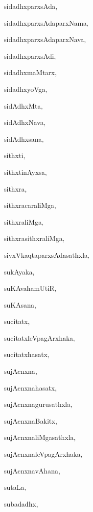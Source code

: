 \begin{multicols}{2}
{sidadhxparxsAda}, \pageref{sidadhxparxsAda}

{sidadhxparxsAdaparxNama}, \pageref{sidadhxparxsAdaparxNama}

{sidadhxparxsAdaparxNava}, \pageref{sidadhxparxsAdaparxNava}

{sidadhxparxsAdi}, \pageref{sidadhxparxsAdi}

{sidadhxmaMtarx}, \pageref{sidadhxmaMtarx}

{sidadhxyoVga}, \pageref{sidadhxyoVga}

{sidAdhxMta}, \pageref{sidAdhxMta}

{sidAdhxNava}, \pageref{sidAdhxNava}

{sidAdhxsana}, \pageref{sidAdhxsana}

{sithxti}, \pageref{sithxti}

{sithxtinAyxsa}, \pageref{sithxtinAyxsa}

{sithxra}, \pageref{sithxra}

{sithxracaraliMga}, \pageref{sithxracaraliMga}

{sithxraliMga}, \pageref{sithxraliMga}

{sithxrasithxraliMga}, \pageref{sithxrasithxraliMga}

{sivxVkaqtaparxsAdasathxla}, \pageref{sivxVkaqtaparxsAdasathxla}

{sukAyaka}, \pageref{sukAyaka}

{suKAvahamUtiR}, \pageref{suKAvahamUtiR}

{suKAsana}, \pageref{suKAsana}

{sucitatx}, \pageref{sucitatx}

{sucitatxleVpagArxhaka}, \pageref{sucitatxleVpagArxhaka}

{sucitatxhasatx}, \pageref{sucitatxhasatx}

{sujAcnxna}, \pageref{sujAcnxna}

{sujAcnxnahasatx}, \pageref{sujAcnxnahasatx}

{sujAcnxnagurusathxla}, \pageref{sujAcnxnagurusathxla}

{sujAcnxnaBakitx}, \pageref{sujAcnxnaBakitx}

{sujAcnxnaliMgasathxla}, \pageref{sujAcnxnaliMgasathxla}

{sujAcnxnaleVpagArxhaka}, \pageref{sujAcnxnaleVpagArxhaka}

{sujAcnxnavAhana}, \pageref{sujAcnxnavAhana}

{sutaLa}, \pageref{sutaLa}

{subadadhx}, \pageref{subadadhx}


\end{multicols}
